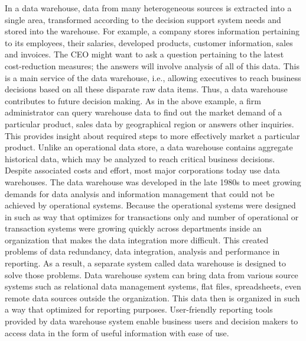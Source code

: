 \documentclass{article}
\begin{document}
In a data warehouse, data from many heterogeneous sources is extracted into a single area, transformed according to the decision support system needs and stored into the warehouse. For example, a company stores information pertaining to its employees, their salaries, developed products, customer information, sales and invoices. The CEO might want to ask a question pertaining to the latest cost-reduction measures; the answers will involve analysis of all of this data. This is a main service of the data warehouse, i.e., allowing executives to reach business decisions based on all these disparate raw data items.
Thus, a data warehouse contributes to future decision making. As in the above example, a firm administrator can query warehouse data to find out the market demand of a particular product, sales data by geographical region or answers other inquiries. This provides insight about required steps to more effectively market a particular product. Unlike an operational data store, a data warehouse contains aggregate historical data, which may be analyzed to reach critical business decisions. Despite associated costs and effort, most major corporations today use data warehouses. The data warehouse was developed in the late 1980s to meet growing demands for data analysis and information management that could not be achieved by operational systems. Because the operational systems were designed in such as way that optimizes for transactions only and number of operational or transaction systems were growing quickly across departments inside an organization that makes the data integration more difficult. This created problems of data redundancy, data integration, analysis and performance in reporting.
As a result, a separate system called data warehouse is designed to solve those problems. Data warehouse system can bring data from various source systems such as relational data management systems, flat files, spreadsheets, even remote data sources outside the organization. This data then is organized in such a way that optimized for reporting purposes. User-friendly reporting tools provided by data warehouse system enable business users and decision makers to access data in the form of useful information with ease of use.
 
\end{document}
